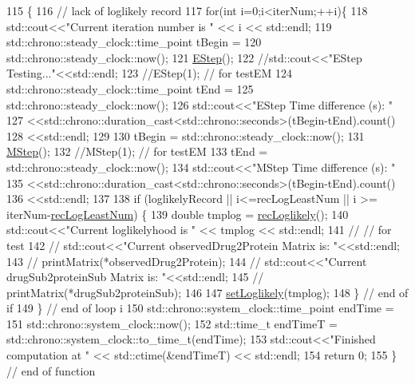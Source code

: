 \begin{DoxyCode}
115                  \{
116     \textcolor{comment}{// lack of loglikely record}
117     \textcolor{keywordflow}{for}(\textcolor{keywordtype}{int} i=0;i<iterNum;++i)\{
118       std::cout<<\textcolor{stringliteral}{"Current iteration number is "} << i << std::endl;
119       std::chrono::steady\_clock::time\_point tBegin =
120         std::chrono::steady\_clock::now();
121       \hyperlink{classgift_1_1_e_m_ae362692fa8da7596544e0e484b44e6fb}{EStep}();
122       \textcolor{comment}{//std::cout<<"EStep Testing..."<<std::endl;}
123       \textcolor{comment}{//EStep(1); // for testEM}
124       std::chrono::steady\_clock::time\_point tEnd =
125         std::chrono::steady\_clock::now();
126       std::cout<<\textcolor{stringliteral}{"EStep Time difference (s): "}
127        <<std::chrono::duration\_cast<std::chrono::seconds>(tBegin-tEnd).count()
128                <<std::endl;
129 
130       tBegin = std::chrono::steady\_clock::now();
131       \hyperlink{classgift_1_1_e_m_ab79cafeefe4ac1574990b83dfa02b762}{MStep}();
132       \textcolor{comment}{//MStep(1); // for testEM}
133       tEnd = std::chrono::steady\_clock::now();
134       std::cout<<\textcolor{stringliteral}{"MStep Time difference (s): "}
135        <<std::chrono::duration\_cast<std::chrono::seconds>(tBegin-tEnd).count()
136                <<std::endl;
137 
138       \textcolor{keywordflow}{if} (loglikelyRecord || i<=recLogLeastNum || i >= iterNum-\hyperlink{namespacegift_ab632fcb7ab144fdde38c5a4154e2b5b7}{recLogLeastNum}) \{
139         \textcolor{keywordtype}{double} tmplog = \hyperlink{classgift_1_1_e_m_a94cb6b1e0ee9c60c04356cd4061a6465}{recLoglikely}();
140         std::cout<<\textcolor{stringliteral}{"Current loglikelyhood is "} << tmplog << std::endl;
141         \textcolor{comment}{// // for test}
142         \textcolor{comment}{// std::cout<<"Current observedDrug2Protein Matrix is: "<<std::endl;}
143         \textcolor{comment}{// printMatrix(*observedDrug2Protein);}
144         \textcolor{comment}{// std::cout<<"Current drugSub2proteinSub Matrix is: "<<std::endl;}
145         \textcolor{comment}{// printMatrix(*drugSub2proteinSub);}
146 
147         \hyperlink{classgift_1_1_e_m_a5672958e550c66f7417ded6b846714b4}{setLoglikely}(tmplog);
148       \} \textcolor{comment}{// end of if}
149     \} \textcolor{comment}{// end of loop i}
150     std::chrono::system\_clock::time\_point endTime =
151       std::chrono::system\_clock::now();
152     std::time\_t endTimeT = std::chrono::system\_clock::to\_time\_t(endTime);
153     std::cout<<\textcolor{stringliteral}{"Finished computation at "} << std::ctime(&endTimeT) << std::endl;
154     \textcolor{keywordflow}{return} 0;
155   \} \textcolor{comment}{// end of function}
\end{DoxyCode}
